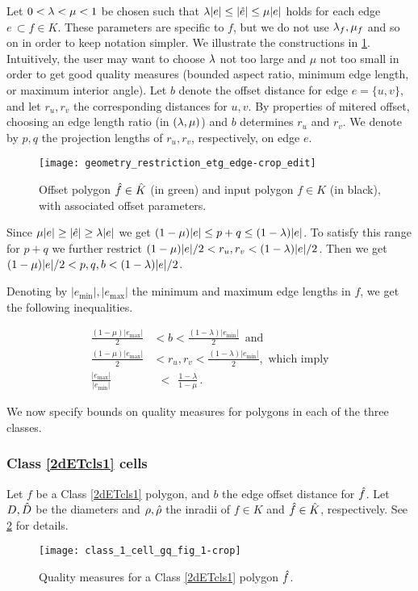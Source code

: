 Let $0 < \lambda < \mu < 1$ be chosen such that $\lambda |e| \leq |\hat{e}| \leq \mu |e|$ holds for each edge $e \, \subset f \in K$.
These parameters are specific to $f$, but we do not use $\lambda_f,\mu_f$ and so on in order to keep notation simpler.
We illustrate the constructions in \cref{fig:2dETcls1edgeconstr}.
Intuitively, the user may want to choose $\lambda$ not too large and $\mu$ not too small in order to get good quality measures (bounded aspect ratio, minimum edge length, or maximum interior angle).
Let $b$ denote the offset distance for edge $e=\{u,v\}$, and let $r_u,r_v$ the corresponding distances for $u,v$.
By properties of mitered offset, choosing an edge length ratio (in $(\lambda,\mu)$) and $b$ determines $r_u$ and $r_v$.
We denote by $p,q$ the projection lengths of $r_u, r_v$, respectively, on edge $e$.
\begin{figure}[htp!]
  \centering
  \texttt{[image: geometry\_restriction\_etg\_edge-crop\_edit]}
  \caption{Offset polygon $\hat{f} \in \hat{K}$ (in green) and input polygon $f \in K$ (in black), with associated offset parameters.}
  \label{fig:2dETcls1edgeconstr}
\end{figure}

Since $\mu |e|\geq |\hat{e}| \geq \lambda |e|$ we get $(1 - \mu) |e|\leq p + q \leq (1 -\lambda) |e|$.
  To satisfy this range for $p + q$ we further restrict $(1 - \mu)|e|/2 < r_u, r_v < (1 - \lambda)|e|/2$.
  Then we get $(1 -\mu) |e|/2 < p, q, b < (1 -\lambda) |e|/2$.

Denoting by $|e_{\min}|, |e_{\max}|$ the minimum and maximum edge lengths in $f$, we get the following inequalities.

\begin{align}
  \frac{(1 -\mu)|e_{\max}|}{2} & < b < \frac{(1 -\lambda)|e_{\min}|}{2}\, \mbox{ and } \label{eq:edofbound} \\
  \frac{(1 -\mu)|e_{\max}|}{2} & < r_u, r_v < \frac{(1 -\lambda)|e_{\min}|}{2}, \mbox{ which imply} \label{eq:vrofbound} \\
  \frac{|e_{\max}|}{|e_{\min}|} & ~~ < ~~ \frac{1- \lambda}{ 1- \mu} \, . \label{eq:edmamiratio}
\end{align}

We now specify bounds on quality measures for polygons in each of the three classes.
\subsubsection{Class \ref{2dETcls1} cells} \label{sssec:2dETcls1gq}
Let $f$ be a Class \ref{2dETcls1} polygon, and $b$ the edge offset distance for $\hat{f}$.
Let $D, \hat{D}$ be the diameters and $\rho, \hat{\rho}$ the inradii of $f \in K$ and $\hat{f} \in \hat{K}$, respectively.
See \cref{fig:2dETcls1gq} for details. 
\begin{figure}[htp!]
  \centering
  \texttt{[image: class\_1\_cell\_gq\_fig\_1-crop]}
  \caption{Quality measures for a Class \ref{2dETcls1} polygon $\hat{f}$.}
  \label{fig:2dETcls1gq}
\end{figure}

